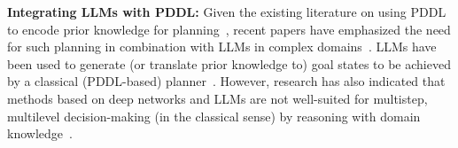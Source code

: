 \vspace{-0.75em}
\textbf{Integrating LLMs with PDDL:} Given the existing literature on using PDDL to encode prior knowledge for planning~\cite{pddl}, recent papers have emphasized the need for such planning in combination with LLMs in complex domains~\cite{silver2023generalized, silver2022pddl}. LLMs have been used to generate (or translate prior knowledge to) goal states to be achieved by a classical (PDDL-based) planner~\cite{liu2023llmp, xie2023translating}. %
However, research has also indicated that methods based on deep networks and LLMs are not well-suited for multistep, multilevel decision-making (in the classical sense) by reasoning with domain knowledge~\cite{valmeekam2023large}. %
